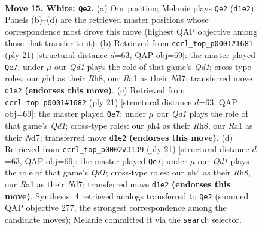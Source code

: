 \documentclass[11pt]{article}
\begin{document}
\begin{figure}[p]
\label{fig:thought-m26}
\end{figure}

\clearpage

\begin{figure}[p]\centering
\begin{subfigure}{0.46\textwidth}\centering
\resizebox{\linewidth}{!}{%
\newchessgame
\chessboard[
  setfen={r1b1k2r/4bp2/1qn1pn2/p2p2p1/3P3p/5N1P/PP3PP1/RNBQKB1R w Qkq - 0 15},
  showmover=false,
  pgfstyle=straightmove, color=movearrow, markmove={d1-e2}
]}
\caption{}
\end{subfigure}\hfill
\begin{subfigure}{0.46\textwidth}\centering
\resizebox{\linewidth}{!}{%
\newchessgame
\chessboard[
  setfen={r1bqk2r/1p1n1ppp/p2bp3/2p5/2PPQ3/P3BN2/1P3PPP/R3KB1R b KQkq - 1 11},
  showmover=false,
  pgfstyle=straightmove, color=movearrow, markmove={d8-e7}
]}
\caption{}
\end{subfigure}
\\[4pt]
\begin{subfigure}{0.46\textwidth}\centering
\resizebox{\linewidth}{!}{%
\newchessgame
\chessboard[
  setfen={r1bqk2r/1p1n1ppp/p2bp3/2p5/2PPQ3/P3BN2/1P3PPP/R3KB1R b KQkq - 1 11},
  showmover=false,
  pgfstyle=straightmove, color=movearrow, markmove={d8-e7}
]}
\caption{}
\end{subfigure}\hfill
\begin{subfigure}{0.46\textwidth}\centering
\resizebox{\linewidth}{!}{%
\newchessgame
\chessboard[
  setfen={r1bqk2r/1p1n1ppp/p2bp3/2p5/2PPQ3/P3BN2/1P3PPP/R3KB1R b KQkq - 1 11},
  showmover=false,
  pgfstyle=straightmove, color=movearrow, markmove={d8-e7}
]}
\caption{}
\end{subfigure}
\caption{\textbf{Move 15, White: \texttt{Qe2}.} (a) Our position; Melanie plays \texttt{Qe2} (\texttt{d1e2}). Panels (b)--(d) are the retrieved master positions whose correspondence most drove this move (highest QAP objective among those that transfer to it). (b) Retrieved from \texttt{ccrl\_top\_p0001\#1681} (ply 21) [structural distance $d$=63, QAP obj=69]: the master played \texttt{Qe7}; under $\mu$ our \emph{Qd1} plays the role of that game's \emph{Qd1}; cross-type roles: our \emph{p}h4 as their \emph{R}h8, our \emph{R}a1 as their \emph{N}d7; transferred move \texttt{d1e2} \textbf{(endorses this move)}. (c) Retrieved from \texttt{ccrl\_top\_p0001\#1682} (ply 21) [structural distance $d$=63, QAP obj=69]: the master played \texttt{Qe7}; under $\mu$ our \emph{Qd1} plays the role of that game's \emph{Qd1}; cross-type roles: our \emph{p}h4 as their \emph{R}h8, our \emph{R}a1 as their \emph{N}d7; transferred move \texttt{d1e2} \textbf{(endorses this move)}. (d) Retrieved from \texttt{ccrl\_top\_p0002\#3139} (ply 21) [structural distance $d$=63, QAP obj=69]: the master played \texttt{Qe7}; under $\mu$ our \emph{Qd1} plays the role of that game's \emph{Qd1}; cross-type roles: our \emph{p}h4 as their \emph{R}h8, our \emph{R}a1 as their \emph{N}d7; transferred move \texttt{d1e2} \textbf{(endorses this move)}. Synthesis: 4 retrieved analogs transferred to \texttt{Qe2} (summed QAP objective 277, the strongest correspondence among the candidate moves); Melanie committed it via the \texttt{search} selector.}

\end{figure}
\end{document}
